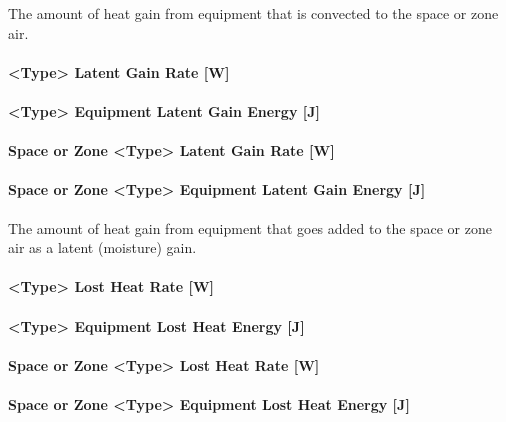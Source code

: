 The amount of heat gain from equipment that is convected to the space or zone air.

\paragraph{<Type> Latent Gain Rate {[}W{]}}\label{equipment-latent-heating-rate-w}

\paragraph{<Type> Equipment Latent Gain Energy {[}J{]}}\label{equipment-latent-heating-energy-j}

\paragraph{Space or Zone <Type> Latent Gain Rate {[}W{]}}\label{zone-equipment-latent-heating-rate-w}

\paragraph{Space or Zone <Type> Equipment Latent Gain Energy {[}J{]}}\label{zone-equipment-latent-heating-energy-j}

The amount of heat gain from equipment that goes added to the space or zone air as a latent (moisture) gain.

\paragraph{<Type> Lost Heat Rate {[}W{]}}\label{equipment-lost-heating-rate-w}

\paragraph{<Type> Equipment Lost Heat Energy {[}J{]}}\label{equipment-lost-heating-energy-j}

\paragraph{Space or Zone <Type> Lost Heat Rate {[}W{]}}\label{zone-equipment-lost-heating-rate-w}

\paragraph{Space or Zone <Type> Equipment Lost Heat Energy {[}J{]}}\label{zone-equipment-lost-heating-energy-j}

